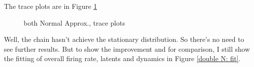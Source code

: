\documentclass[]{article}
\begin{document}
The trace plots are in Figure \ref{double N: trace}
\begin{figure}[h!]
	\caption{both Normal Approx., trace plots}
	\label{double N: trace}
\end{figure}

Well, the chain hasn't achieve the stationary distribution. So there's no need to see further results. But to show the improvement and for comparison, I still show the fitting of overall firing rate, latents and dynamics in Figure \ref{double N: fit}.
\end{document}
